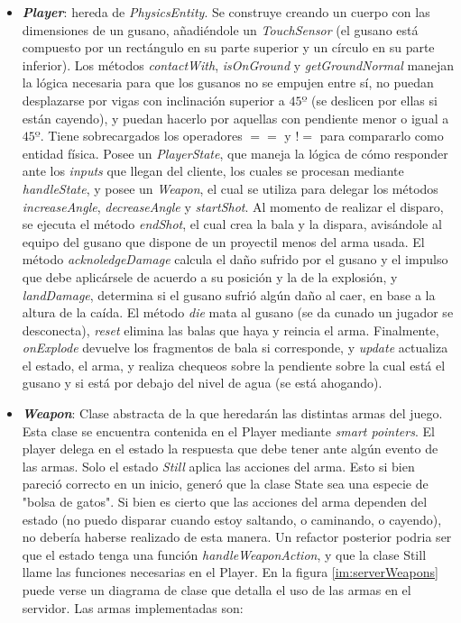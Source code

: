 \begin{itemize}
	\item \textbf{\textit{Player}}: hereda de \textit{PhysicsEntity}. Se construye creando un cuerpo con las dimensiones de un gusano, añadiéndole un \textit{TouchSensor} (el gusano está compuesto por un rectángulo en su parte superior y un círculo en su parte inferior). Los métodos \textit{contactWith}, \textit{isOnGround} y \textit{getGroundNormal} manejan la lógica necesaria para que los gusanos no se empujen entre sí, no puedan desplazarse por vigas con inclinación superior a $45º$ (se deslicen por ellas si están cayendo), y puedan hacerlo por aquellas con pendiente menor o igual a $45º$. Tiene sobrecargados los operadores $==$ y $!=$ para compararlo como entidad física. Posee un \textit{PlayerState}, que maneja la lógica de cómo responder ante los \textit{inputs} que llegan del cliente, los cuales se procesan mediante \textit{handleState}, y posee un \textit{Weapon}, el cual se utiliza para delegar los métodos \textit{increaseAngle}, \textit{decreaseAngle} y \textit{startShot}. Al momento de realizar el disparo, se ejecuta el método \textit{endShot}, el cual crea la bala y la dispara, avisándole al equipo del gusano que dispone de un proyectil menos del arma usada. El método \textit{acknoledgeDamage} calcula el daño sufrido por el gusano y el impulso que debe aplicársele de acuerdo a su posición y la de la explosión, y \textit{landDamage}, determina si el gusano sufrió algún daño al caer, en base a la altura de la caída. El método \textit{die} mata al gusano (se da cunado un jugador se desconecta), \textit{reset} elimina las balas que haya y reincia el arma. Finalmente, \textit{onExplode} devuelve los fragmentos de bala si corresponde, y \textit{update} actualiza el estado, el arma, y realiza chequeos sobre la pendiente sobre la cual está el gusano y si está por debajo del nivel de agua (se está ahogando).
	
	\item \textbf{\textit{Weapon}}: Clase abstracta de la que heredarán las distintas armas del juego. Esta clase se encuentra contenida en el Player mediante \emph{smart pointers}. El player delega en el estado la respuesta que debe tener ante algún evento de las armas. Solo el estado \emph{Still} aplica las acciones del arma. Esto si bien pareció correcto en un inicio, generó que la clase State sea una especie de "bolsa de gatos". Si bien es cierto que las acciones del arma dependen del estado (no puedo disparar cuando estoy saltando, o caminando, o cayendo), no debería haberse realizado de esta manera. Un refactor posterior podria ser que el estado tenga una función \emph{handleWeaponAction}, y que la clase Still llame las funciones necesarias en el Player. En la figura \ref{im:serverWeapons} puede verse un diagrama de clase que detalla el uso de las armas en el servidor. Las armas implementadas son:
	

\end{itemize}
